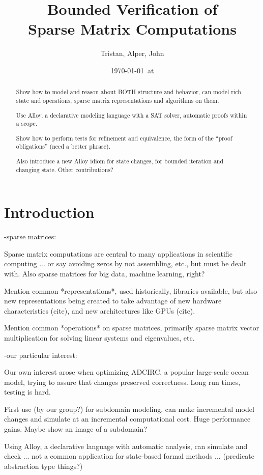 \documentclass{article}
\title{Bounded Verification of\\Sparse Matrix Computations}
\author{Tristan, Alper, John}
\date{\today\ at \currenttime}
\begin{document}
\maketitle

\begin{abstract}
\parindent 0pt
\parskip 10pt

Show how to model and reason about BOTH structure and behavior, can
model rich state and operations, sparse matrix representations and
algorithms on them.

Use Alloy, a declarative modeling language with a SAT solver,
automatic proofs within a scope.

Show how to perform tests for refinement and equivalence, the form of
the ``proof obligations'' (need a better phrase).

Also introduce a new Alloy idiom for state changes, for bounded
iteration and changing state.  Other contributions?
\end{abstract}

\section{Introduction}

-sparse matrices:

Sparse matrix computations are central to many applications in
scientific computing ... or say avoiding zeros by not assembling,
etc., but must be dealt with.  Also sparse matrices for big data,
machine learning, right?

Mention common *representations*, used historically, libraries
available, but also new representations being created to take
advantage of new hardware characteristics (cite), and new
architectures like GPUs (cite).

Mention common *operations* on sparse matrices, primarily sparse
matrix vector multiplication for solving linear systems and
eigenvalues, etc.

-our particular interest:

Our own interest arose when optimizing ADCIRC, a popular large-scale
ocean model, trying to assure that changes preserved correctness.
Long run times, testing is hard.

First use (by our group?) for subdomain modeling, can make incremental
model changes and simulate at an incremental computational cost.
Huge performance gains.  Maybe show an image of a subdomain?

Using Alloy, a declarative language with automatic analysis, can
simulate and check ... not a common application for state-based formal
methods ... (predicate abstraction type things?)
\end{document}
